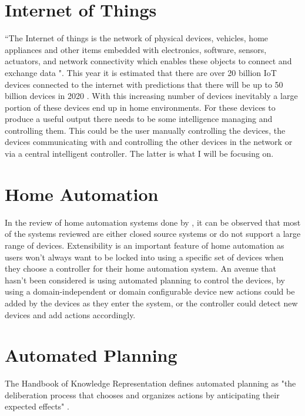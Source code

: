 \section{Internet of Things}
``The Internet of things is the network of physical devices, vehicles, home
appliances and other items embedded with electronics, software, sensors,
actuators, and network connectivity which enables these objects to connect and
exchange data \citep{Contributors2018}". This year it is estimated that there
are over 20 billion IoT devices connected to the internet \citep{Statista2015}
with predictions that there will be up to 50 billion devices in 2020
\citep{Evans2011}. With this increasing number of devices inevitably a large
portion of these devices end up in home environments. For these devices to
produce a useful output there needs to be some intelligence managing and
controlling them. This could be the user manually controlling the devices, the
devices communicating with and controlling the other devices in the network or
via a central intelligent controller. The latter is what I will be focusing on.

\section{Home Automation}
In the review of home automation systems done by \cite{Lobaccaro2016}, it can be
observed that most of the systems reviewed are either closed source systems or
do not support a large range of devices. Extensibility is an important feature
of home automation as users won't always want to be locked into using a specific
set of devices when they choose a controller for their home automation system.
An avenue that hasn't been considered is using automated planning to control the
devices, by using a domain-independent or domain configurable device new actions
could be added by the devices as they enter the system, or the controller could
detect new devices and add actions accordingly.

\section{Automated Planning}
The Handbook of Knowledge Representation defines automated planning as "the
deliberation process that chooses and organizes actions by anticipating their
expected effects" \citep{Cimatti2008}.

